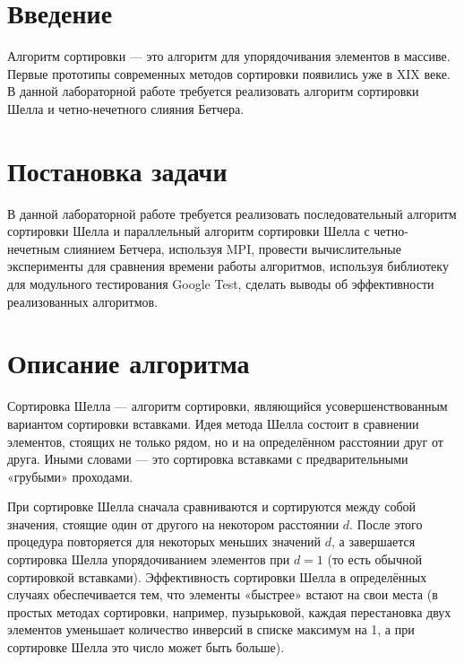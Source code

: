 \documentclass{report}
\begin{document}
\setcounter{page}{2}

\tableofcontents
\newpage

\section*{Введение}
\par Алгоритм сортировки — это алгоритм для упорядочивания элементов в массиве. Первые прототипы современных методов сортировки появились уже в XIX веке. В данной лабораторной работе требуется реализовать алгоритм сортировки Шелла и четно-нечетного слияния Бетчера.
\newpage

\section*{Постановка задачи}
\par В данной лабораторной работе требуется реализовать последовательный алгоритм сортировки Шелла и параллельный алгоритм сортировки Шелла с четно-нечетным слиянием Бетчера, используя MPI, провести вычислительные эксперименты для сравнения времени работы алгоритмов, используя библиотеку для модульного тестирования  Google Test, сделать выводы об эффективности реализованных алгоритмов.
\newpage

\section*{Описание алгоритма}
\par Сортировка Шелла — алгоритм сортировки, являющийся усовершенствованным вариантом сортировки вставками. Идея метода Шелла состоит в сравнении элементов, стоящих не только рядом, но и на определённом расстоянии друг от друга. Иными словами — это сортировка вставками с предварительными «грубыми» проходами.
\par При сортировке Шелла сначала сравниваются и сортируются между собой значения, стоящие один от другого на некотором расстоянии $d$. После этого процедура повторяется для некоторых меньших значений $d$, а завершается сортировка Шелла упорядочиванием элементов при $d = 1$ (то есть обычной сортировкой вставками). Эффективность сортировки Шелла в определённых случаях обеспечивается тем, что элементы «быстрее» встают на свои места (в простых методах сортировки, например, пузырьковой, каждая перестановка двух элементов уменьшает количество инверсий в списке максимум на 1, а при сортировке Шелла это число может быть больше).
\end{document}
